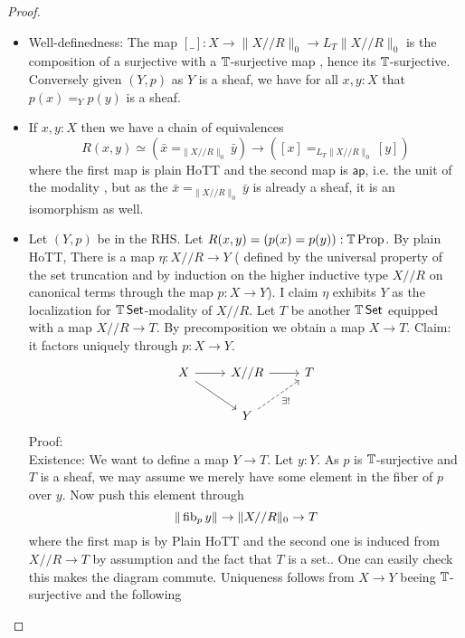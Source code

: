 \begin{proof}
	\begin{itemize}
		\item Well-definedness: The map $[\_] : X \to \|X // R\|_0 \to L_T \|X // R\|_0$ is the composition of a surjective with a $\mathbb{T}$-surjective map \todocite, hence its $\mathbb{T}$-surjective. \\
		Conversely given $(Y,p)$ as $Y$ is a sheaf, we have for all $x,y : X$ that $p(x) =_Y p(y)$ is a sheaf.
		\item If $x,y : X$ then we have a chain of equivalences 
		\[
		R(x,y) \simeq (\bar x =_{\|X//R\|_0} \bar y) \to ([x] =_{L_T\|X//R\|_0} [y])
		\]
		where the first map is plain HoTT and the second map is $\mathsf{ap}$, i.e. the unit of the modality \todocite, but as the $\bar x =_{\|X//R\|_0} \bar y$ is already a sheaf, it is an isomorphism as well. \\
		\item Let $(Y,p)$ be in the RHS. Let $R(x,y) = (p(x)=p(y)) : \mathbb{T} \operatorname{Prop}$. By plain HoTT, There is a map $\eta :  X // R  \to Y$ ( defined by the universal property of the set truncation and by induction on the higher inductive type $ X // R$ on canonical terms through the map $p : X \to Y$). I claim $\eta$ exhibits $Y$ as the localization for $\mathbb{T} \operatorname{\mathsf {Set}}$-modality of $X // R$. Let $T$ be another $\mathbb{T} \operatorname{\mathsf {Set}}$ equipped with a map $X // R  \to T$. By precomposition we obtain a map $X \to T$. 
		Claim: it factors uniquely through $p : X \to Y$. 
		\[\begin{tikzcd}
			X & {X // R} & T \\
			& Y
			\arrow[from=1-1, to=1-2]
			\arrow[from=1-1, to=2-2]
			\arrow[from=1-2, to=1-3]
			\arrow["{\exists!}"', dashed, from=2-2, to=1-3]
		\end{tikzcd}\]
		Proof: \\
		Existence: We want to define a map $Y \to T$. Let $y : Y$. As $p$ is $\mathbb{T}$-surjective and $T$ is a sheaf, we may assume we merely have some element in the fiber of $p$ over $y$. Now push this element through     
		\[\|\operatorname{fib}_p y\| \to \|X // R\|_0 \to T\]
		where the first map is by Plain HoTT and the second one is induced from $X // R \to T$ by assumption and the fact that $T$ is a set.. One can easily check this makes the diagram commute.
		Uniqueness follows from $X \to Y$ beeing $\mathbb{T}$-surjective and the following

\end{itemize}
\end{proof}
